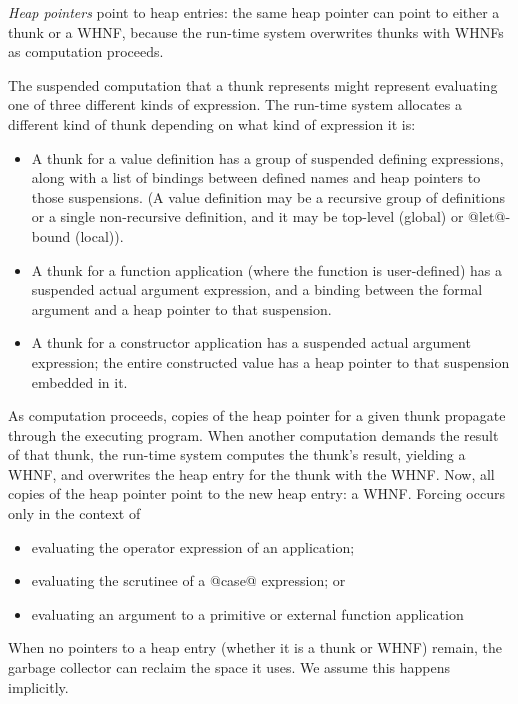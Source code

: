 \documentclass[10pt]{article}
\begin{document}
{\it Heap pointers} point to heap entries: the same heap pointer can point to either a thunk or a WHNF, because the run-time system overwrites thunks with WHNFs as computation proceeds.

The suspended computation that a thunk represents might represent evaluating one of three different kinds of expression. The run-time system allocates a different kind of thunk depending on what kind of expression it is:
\begin{itemize}
\item A thunk for a value definition has a group of suspended defining expressions, along with a list of bindings between defined names and heap pointers to those suspensions. (A value definition may be a recursive group of definitions or a single non-recursive definition, and it may be top-level (global) or @let@-bound (local)).

\item A thunk for a function application (where the function is user-defined) has a suspended actual argument expression, and a binding between the formal argument and a heap pointer to that suspension.

\item A thunk for a constructor application has a suspended actual argument expression; the entire constructed value has a heap pointer to that suspension embedded in it.
\end{itemize}

As computation proceeds, copies of the heap pointer for a given thunk propagate through the executing program. 
When another computation demands the result of that thunk, the run-time system computes the thunk's result, yielding a WHNF, and overwrites the heap entry for the thunk with the WHNF. Now, all copies of the heap pointer point to the new heap entry: a WHNF. Forcing occurs
only in the context of
\begin{itemize}
\item evaluating the operator expression of an application; 

\item evaluating the scrutinee of a @case@ expression; or 

\item evaluating an argument to a primitive or external function application
\end{itemize}

When no pointers to a heap entry (whether it is a thunk or WHNF) remain, the garbage collector can reclaim the space it uses. We assume this happens implicitly.
\end{document}
